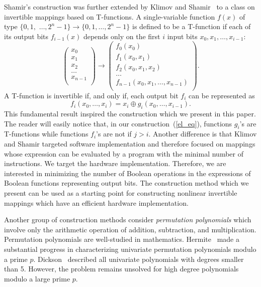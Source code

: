 \documentclass[9pt,conference]{IEEEtran} \usepackage{times}
\begin{document}
Shamir's construction was further extended by Klimov and Shamir~\cite{KlS02,Kl05} to a class on invertible mappings based on T-functions. A single-variable function $f(x)$ of type 
$\{0,1,$ $\ldots,2^n-1\} \rightarrow \{0,1,\ldots,2^n-1\}$ is defined to be a T-function
if each of its output bits $f_{i-1}(x)$ depends only on 
the first $i$ input bits $x_0, x_1, \ldots, x_{i-1}$:
\[
\left(
\begin{array}{l}
{x}_0 \\
{x}_1 \\
{x}_2 \\
\ldots \\
{x}_{n-1} \\
\end{array}
\right)
\rightarrow
\left(
\begin{array}{l}
f_0(x_0) \\
f_1(x_0, x_1) \\
f_2(x_0, x_1, x_2) \\
\ldots \\
f_{n-1}(x_0, x_1, \ldots, x_{n-1}) \\
\end{array}
\right).
\]
A T-function is invertible if, and only if, each output bit $f_i$ 
can be represented as 
\[
f_i(x_0,\ldots,x_i) = x_i \oplus g_i(x_0,\ldots,x_{i-1}).
\]
This fundamental result inspired the construction which we present in this paper.
The reader will easily notice that, in our construction~(\ref{el_eq}), 
functions $g_i$'s are T-functions while functions $f_i$'s are not if $j > i$.
Another difference is that Klimov and Shamir targeted software implementation
and therefore focused on mappings 
whose expression can be evaluated by a program with the minimal number 
of instructions. We target the hardware implementation.
Therefore, we are interested in minimizing the number of Boolean operations 
in the expressions of Boolean functions representing output bits.
The construction method which we present can be used as a starting point for
constructing nonlinear invertible mappings which have an efficient hardware implementation.

Another group of construction methods consider {\em permutation polynomials} which 
involve only the arithmetic operation of addition, subtraction, and multiplication.
Permutation polynomials are well-studied in mathematics. Hermite~\cite{LiH94} made a substantial progress in characterizing univariate permutation polynomials modulo a prime $p$. 
Dickson~\cite{Di01} described all univariate polynomials with degrees smaller than 5. However, the problem remains unsolved for high degree polynomials modulo a large prime $p$. 
\end{document}
